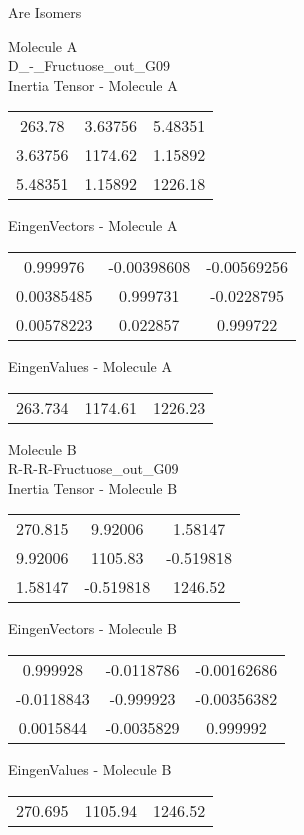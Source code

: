 \begin{center}
\vtab
\vtab
\textcolor{NavyBlue}{\Large Are Isomers}
\end{center}
\newpage
\begin{multicols}{2}
\begin{center}
Molecule A \\ 
D\_-\_Fructuose\_out\_G09
\\
Inertia Tensor - Molecule A \\
\vtab
\begin{tabular}{|c c c|}
263.78	 & 	3.63756	 & 	5.48351	 \\
3.63756	 & 	1174.62	 & 	1.15892	 \\
5.48351	 & 	1.15892	 & 	1226.18
\end{tabular}

\vtab
 EingenVectors - Molecule A     \\
\vtab
\begin{tabular}{|c c c|}
0.999976	 & 	-0.00398608	 & 	-0.00569256	 \\
0.00385485	 & 	0.999731	 & 	-0.0228795	 \\
0.00578223	 & 	0.022857	 & 	0.999722
\end{tabular}

\vtab
 EingenValues - Molecule A     \\
\vtab
\begin{tabular}{|c c c|}
263.734	 & 	1174.61	 & 	1226.23
\end{tabular}
\columnbreak

Molecule B \\ 
R-R-R-Fructuose\_out\_G09
\\
Inertia Tensor - Molecule B \\
\vtab
\begin{tabular}{|c c c|}
270.815	 & 	9.92006	 & 	1.58147	 \\
9.92006	 & 	1105.83	 & 	-0.519818	 \\
1.58147	 & 	-0.519818	 & 	1246.52
\end{tabular}

\vtab
 EingenVectors - Molecule B     \\
\vtab
\begin{tabular}{|c c c|}
0.999928	 & 	-0.0118786	 & 	-0.00162686	 \\
-0.0118843	 & 	-0.999923	 & 	-0.00356382	 \\
0.0015844	 & 	-0.0035829	 & 	0.999992
\end{tabular}

\vtab
 EingenValues - Molecule B     \\
\vtab
\begin{tabular}{|c c c|}
270.695	 & 	1105.94	 & 	1246.52
\end{tabular}

\end{center}
\end{multicols}
